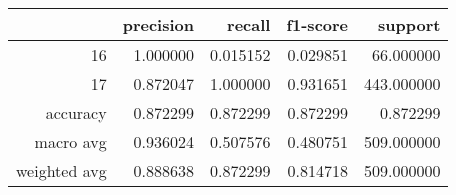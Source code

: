 \begin{tabular}{rrrrr}
\toprule
 & precision & recall & f1-score & support \\
\midrule
16 & 1.000000 & 0.015152 & 0.029851 & 66.000000 \\
17 & 0.872047 & 1.000000 & 0.931651 & 443.000000 \\
accuracy & 0.872299 & 0.872299 & 0.872299 & 0.872299 \\
macro avg & 0.936024 & 0.507576 & 0.480751 & 509.000000 \\
weighted avg & 0.888638 & 0.872299 & 0.814718 & 509.000000 \\
\bottomrule
\end{tabular}
